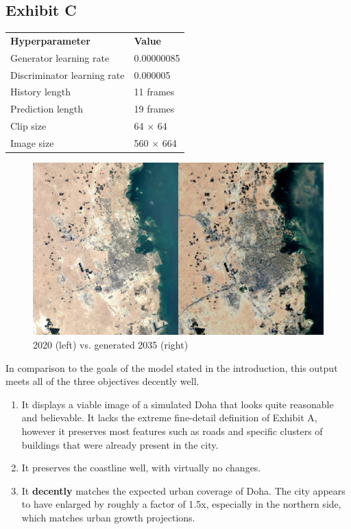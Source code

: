 \documentclass{article}
\begin{document}
\clearpage

\subsection{Exhibit C}

\begin{table}[h]
\begin{tabular}{ll}
\textbf{Hyperparameter} & \textbf{Value}\\
Generator learning rate & 0.00000085\\
Discriminator learning rate & 0.000005\\
History length & 11 frames\\
Prediction length & 19 frames\\
Clip size & 64 $\times$ 64\\
Image size & 560 $\times$ 664\\
\end{tabular}
\end{table}

\begin{figure}[H]
    \caption{2020 (left) vs. generated 2035 (right)}
    \centering
    \includegraphics[width=0.7\linewidth]{exhibit-c-comp.jpg}
\end{figure}

In comparison to the goals of the model stated in the introduction, this output meets all of the three objectives decently well.

\begin{enumerate}[label=(\alph*)]
    \item It displays a viable image of a simulated Doha that looks quite reasonable and believable. It lacks the extreme fine-detail definition of Exhibit A, however it preserves most features such as roads and specific clusters of buildings that were already present in the city.
    \item It preserves the coastline well, with virtually no changes.
    \item It \textbf{decently} matches the expected urban coverage of Doha. The city appears to have enlarged by roughly a factor of 1.5x, especially in the northern side, which matches urban growth projections.
\end{enumerate}
\end{document}
